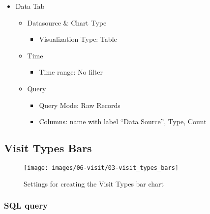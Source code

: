 \documentclass[
]{book}
\providecommand{\tightlist}{%
  \setlength{\itemsep}{0pt}\setlength{\parskip}{0pt}}
\begin{document}
\begin{itemize}
\tightlist
\item
  Data Tab

  \begin{itemize}
  \tightlist
  \item
    Datasource \& Chart Type

    \begin{itemize}
    \tightlist
    \item
      Visualization Type: Table
    \end{itemize}
  \item
    Time

    \begin{itemize}
    \tightlist
    \item
      Time range: No filter
    \end{itemize}
  \item
    Query

    \begin{itemize}
    \tightlist
    \item
      Query Mode: Raw Records
    \item
      Columns: name with label ``Data Source'', Type, Count
    \end{itemize}
  \end{itemize}
\end{itemize}

\hypertarget{visit-types-bars}{%
\subsection*{Visit Types Bars}\label{visit-types-bars}}

\begin{figure}
\texttt{[image: images/06-visit/03-visit\_types\_bars]} \caption{Settings for creating the Visit Types bar chart}\label{fig:visitTypeBars}
\end{figure}

\hypertarget{sql-query-17}{%
\subsubsection*{SQL query}\label{sql-query-17}}
\end{document}
